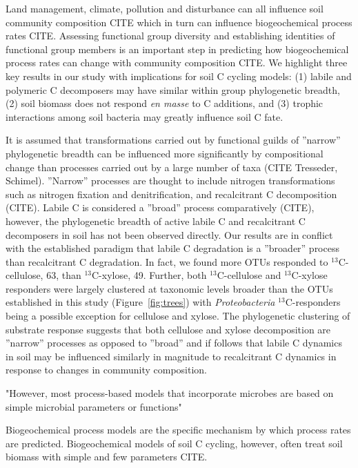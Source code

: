 Land management, climate, pollution and disturbance can all influence soil
community composition CITE which in turn can influence biogeochemical process
rates CITE. Assessing functional group diversity and establishing identities of
functional group members is an important step in predicting how biogeochemical
process rates can change with community composition CITE. We highlight three
key results in our study with implications for soil C cycling models: (1)
labile and polymeric C decomposers may have similar within group phylogenetic
breadth, (2) soil biomass does not respond \textit{en masse} to C additions, and
(3) trophic interactions among soil bacteria may greatly influence soil C fate.

It is assumed that transformations carried out by functional guilds of
''narrow'' phylogenetic breadth can be influenced more significantly by
compositional change than processes carried out by a large number of taxa (CITE
Tresseder, Schimel). ''Narrow'' processes are thought to include nitrogen
transformations such as nitrogen fixation and denitrification, and recalcitrant
C decomposition (CITE). Labile C is considered a ''broad'' process
comparatively (CITE), however, the phylogenetic breadth of active labile C and
recalcitrant C decomposers in soil has not been observed directly. Our results
are in conflict with the established paradigm that labile C degradation is
a ''broader'' process than recalcitrant C degradation. In fact, we found more
OTUs responded to $^{13}$C-cellulose, 63, than $^{13}$C-xylose, 49. Further,
both $^{13}$C-cellulose and $^{13}$C-xylose responders were largely clustered
at taxonomic levels broader than the OTUs established in this study
(Figure~\ref{fig:trees}) with \textit{Proteobacteria} $^{13}$C-responders being
a possible exception for cellulose and xylose. The phylogenetic clustering of
substrate response suggests that both cellulose and xylose decomposition are
''narrow'' processes as opposed to ''broad'' and if follows that labile
C dynamics in soil may be influenced similarly in magnitude to recalcitrant
C dynamics in response to changes in community composition. 

"However, most process-based models that incorporate microbes are based on
simple microbial parameters or functions"

Biogeochemical process models are the specific mechanism by which process rates
are predicted. Biogeochemical models of soil C cycling, however, often treat
soil biomass with simple and few parameters CITE.  


